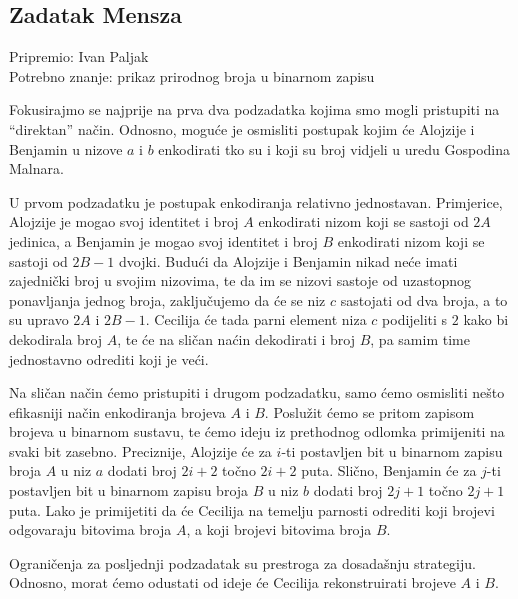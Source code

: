 \subsection*{Zadatak Mensza}
\textsf{Pripremio: Ivan Paljak }\\
\textsf{Potrebno znanje: prikaz prirodnog broja u binarnom zapisu}

Fokusirajmo se najprije na prva dva podzadatka kojima smo mogli pristupiti
na ``direktan'' način. Odnosno, moguće je osmisliti postupak kojim će Alojzije
i Benjamin u nizove $a$ i $b$ enkodirati tko su i koji su broj vidjeli u
uredu Gospodina Malnara.

U prvom podzadatku je postupak enkodiranja relativno jednostavan. Primjerice,
Alojzije je mogao svoj identitet i broj $A$ enkodirati nizom koji se sastoji od
$2A$ jedinica, a Benjamin je mogao svoj identitet i broj $B$ enkodirati nizom
koji se sastoji od $2B - 1$ dvojki.  Budući da Alojzije i Benjamin nikad neće
imati zajednički broj u svojim nizovima, te da im se nizovi sastoje od
uzastopnog ponavljanja jednog broja, zaključujemo da će se niz $c$ sastojati od
dva broja, a to su upravo $2A$ i $2B - 1$. Cecilija će tada parni element niza
$c$ podijeliti s $2$ kako bi dekodirala broj $A$, te će na sličan naćin
dekodirati i broj $B$, pa samim time jednostavno odrediti koji je veći.

Na sličan način ćemo pristupiti i drugom podzadatku, samo ćemo osmisliti nešto
efikasniji način enkodiranja brojeva $A$ i $B$. Poslužit ćemo se pritom zapisom
brojeva u binarnom sustavu, te ćemo ideju iz prethodnog odlomka primijeniti na
svaki bit zasebno. Preciznije, Alojzije će za $i$-ti postavljen bit u binarnom
zapisu broja $A$ u niz $a$ dodati broj $2i + 2$ točno $2i + 2$ puta. Slično,
Benjamin će za $j$-ti postavljen bit u binarnom zapisu broja $B$ u niz $b$ dodati
broj $2j + 1$ točno $2j + 1$ puta. Lako je primijetiti da će Cecilija na temelju
parnosti odrediti koji brojevi odgovaraju bitovima broja $A$, a koji brojevi
bitovima broja $B$.

Ograničenja za posljednji podzadatak su prestroga za dosadašnju strategiju.
Odnosno, morat ćemo odustati od ideje će Cecilija rekonstruirati brojeve $A$
i $B$.

